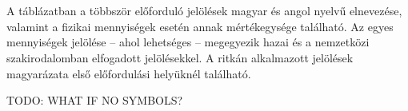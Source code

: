 \newcommand{\tss}{\textsuperscript}
\chapter*{\jelolesek}

A táblázatban a többször előforduló jelölések magyar és angol nyelvű elnevezése,
valamint a fizikai mennyiségek esetén annak mértékegysége található. Az egyes
mennyiségek jelölése – ahol lehetséges – megegyezik hazai és a nemzetközi
szakirodalomban elfogadott jelölésekkel. A ritkán alkalmazott jelölések
magyarázata első előfordulási helyüknél található.

\begin{center}
	\Huge
	TODO: WHAT IF NO SYMBOLS?
\end{center}





